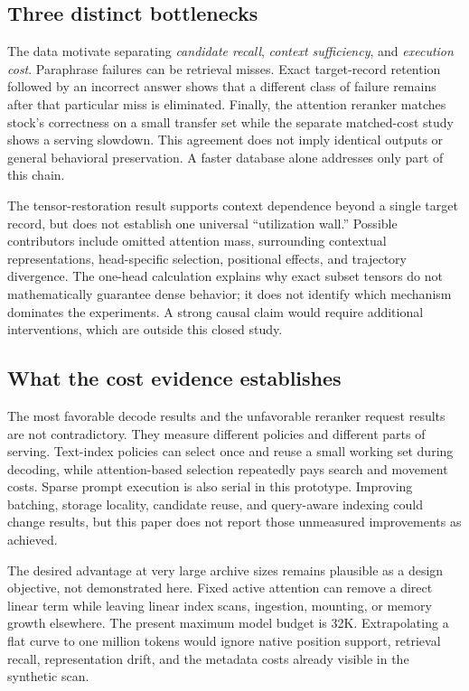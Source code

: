 \documentclass[11pt,letterpaper]{article}
\begin{document}
\subsection{Three distinct bottlenecks}
The data motivate separating \emph{candidate recall}, \emph{context sufficiency}, and \emph{execution cost}. Paraphrase failures can be retrieval misses. Exact target-record retention followed by an incorrect answer shows that a different class of failure remains after that particular miss is eliminated. Finally, the attention reranker matches stock's correctness on a small transfer set while the separate matched-cost study shows a serving slowdown. This agreement does not imply identical outputs or general behavioral preservation. A faster database alone addresses only part of this chain.

The tensor-restoration result supports context dependence beyond a single target record, but does not establish one universal ``utilization wall.'' Possible contributors include omitted attention mass, surrounding contextual representations, head-specific selection, positional effects, and trajectory divergence. The one-head calculation explains why exact subset tensors do not mathematically guarantee dense behavior; it does not identify which mechanism dominates the experiments. A strong causal claim would require additional interventions, which are outside this closed study.

\subsection{What the cost evidence establishes}
The most favorable decode results and the unfavorable reranker request results are not contradictory. They measure different policies and different parts of serving. Text-index policies can select once and reuse a small working set during decoding, while attention-based selection repeatedly pays search and movement costs. Sparse prompt execution is also serial in this prototype. Improving batching, storage locality, candidate reuse, and query-aware indexing could change results, but this paper does not report those unmeasured improvements as achieved.

The desired advantage at very large archive sizes remains plausible as a design objective, not demonstrated here. Fixed active attention can remove a direct linear term while leaving linear index scans, ingestion, mounting, or memory growth elsewhere. The present maximum model budget is 32K. Extrapolating a flat curve to one million tokens would ignore native position support, retrieval recall, representation drift, and the metadata costs already visible in the synthetic scan.
\end{document}
